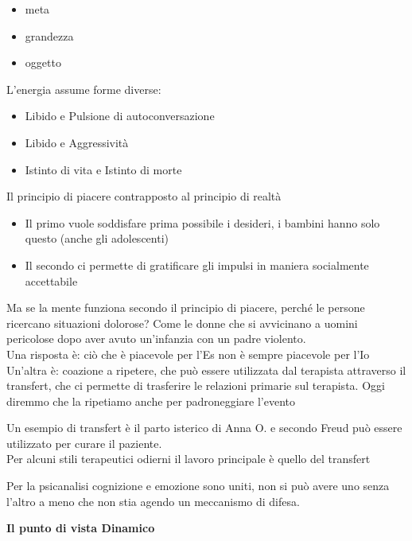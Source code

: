 \documentclass[
]{article}
\providecommand{\tightlist}{%
  \setlength{\itemsep}{0pt}\setlength{\parskip}{0pt}}
\begin{document}
\begin{itemize}
\tightlist
\item
  meta
\item
  grandezza
\item
  oggetto
\end{itemize}

L'energia assume forme diverse:

\begin{itemize}
\tightlist
\item
  Libido e Pulsione di autoconversazione
\item
  Libido e Aggressività
\item
  Istinto di vita e Istinto di morte
\end{itemize}

Il principio di piacere contrapposto al principio di realtà

\begin{itemize}
\tightlist
\item
  Il primo vuole soddisfare prima possibile i desideri, i bambini hanno
  solo questo (anche gli adolescenti)
\item
  Il secondo ci permette di gratificare gli impulsi in maniera
  socialmente accettabile
\end{itemize}

Ma se la mente funziona secondo il principio di piacere, perché le
persone ricercano situazioni dolorose? Come le donne che si avvicinano a
uomini pericolose dopo aver avuto un'infanzia con un padre violento.\\
Una risposta è: ciò che è piacevole per l'Es non è sempre piacevole per
l'Io\\
Un'altra è: coazione a ripetere, che può essere utilizzata dal terapista
attraverso il transfert, che ci permette di trasferire le relazioni
primarie sul terapista. Oggi diremmo che la ripetiamo anche per
padroneggiare l'evento

Un esempio di transfert è il parto isterico di Anna O. e secondo Freud
può essere utilizzato per curare il paziente.\\
Per alcuni stili terapeutici odierni il lavoro principale è quello del
transfert

Per la psicanalisi cognizione e emozione sono uniti, non si può avere
uno senza l'altro a meno che non stia agendo un meccanismo di difesa.

\textbf{Il punto di vista Dinamico}
\end{document}
